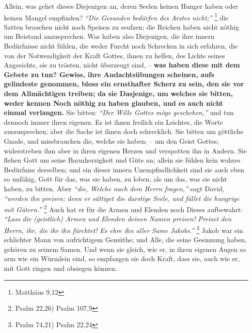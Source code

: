   Allein, was gehet dieses
Diejenigen an, deren Seelen keinen Hunger haben oder keinen Mangel empfinden?
\textit{"`Die Gesunden bedürfen des Arztes nicht;"'}
\footnote{Matthäus 9,12}
die Satten brauchen nicht nach Speisen zu
seufzen; die Reichen haben nicht nöthig um Beistand anzusprechen. Was haben also
Diejenigen, die ihre innern Bedürfnisse  nicht
fühlen, die weder Furcht noch
Schrecken in sich erfahren, die von der Notwendigkeit der Kraft Gottes, ihnen
zu helfen, des Lichts seines Angesichts, sie zu trösten, nicht
überzeugt sind,
-- \textbf{was haben diese mit dem Gebete zu tun? Gewiss, ihre Andachtsübungen
scheinen, aufs gelindeste genommen, bloss ein ernsthafter Scherz zu sein, den
sie vor dem Allmächtigen treiben; da sie Dasjenige, um welches sie bitten, weder
kennen Noch nöthig zu haben glauben, und es auch nicht einmal verlangen.} Sie
bitten:
\textit{"`Der Wille Gottes möge geschehen,"'}
und tun dennoch immer ihren
eigenen. Es ist ihnen freilich ein
Leichtes, die Worte auszusprechen; aber die
Sache ist ihnen doch schrecklich. Sie bitten um göttliche Gnade, und
missbrauchen die, welche sie haben; -- um den Geist Gottes; widerstreben ihm
aber in ihren eigenen Herzen und verspotten ihn in Andern.
Sie flehen Gott um
seine Barmherzigkeit und Güte an; allein sie fühlen kein wahres Bedürfniss
derselben; und ein dieser innern Unempfindlichkeit sind sie auch eben so
unfähig, Gott für das, was sie haben, zu loben, als um das, was sie nicht haben,
zu bitten. Aber  \textit{"`die, Welche nach dem Herrn fragen,"'} sagt David,
\textit{"`werden ihn preisen; denn er sättiget die durstige Seele, und füllet
die hungrige mit Gütern."'}
\footnote{Psalm 22,26) Psalm 107,9}
Auch hat er für die Armen und Elenden
noch Dieses aufbewahrt:
\textit{"`Lass die (geistlich) Armen und Elenden deinen Namen
preisen! Preiset den Herrn, ihr, die ihr ihn fürchtet! Es ehre ihn aller Same
Jakobs."'}
\footnote{Psalm 74,21) Psalm 22,24}
Jakob war ein schlichter Mann von
aufrichtigem Gemüthe; und Alle, die seine Gesinnung haben, gehören zu seinem
Samen. Und wenn sie gleich, wie er, in ihren eigenen Augen so arm wie ein
Würmlein sind, so empfangen sie doch Kraft, dass sie, auch wie er, mit Gott
ringen und obsiegen können.

